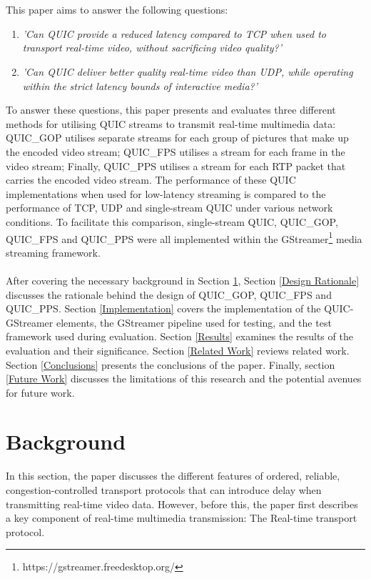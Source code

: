 \documentclass{mpaper}
\begin{document}
\\\\
This paper aims to answer the following questions: 
\begin{enumerate}
\item \textit{'Can QUIC provide a reduced latency compared to TCP when used to transport real-time video, without sacrificing video quality?'}
\item \textit{'Can QUIC deliver better quality real-time video than UDP, while operating within the strict latency bounds of interactive media?'}
\end{enumerate}


\noindent To answer these questions, this paper presents and evaluates three different methods for utilising QUIC streams to transmit real-time multimedia data: QUIC\_GOP utilises separate streams for each group of pictures that make up the encoded video stream; QUIC\_FPS utilises a stream for each frame in the video stream; Finally, QUIC\_PPS utilises a stream for each RTP packet that carries the encoded video stream. The performance of these QUIC implementations when used for low-latency streaming is compared to the performance of TCP, UDP and single-stream QUIC under various network conditions. To facilitate this comparison, single-stream QUIC, QUIC\_GOP, QUIC\_FPS and QUIC\_PPS were all implemented within the GStreamer\footnote{https://gstreamer.freedesktop.org/} media streaming framework.
\\\\
After covering the necessary background in Section \ref{Backgorund}, Section \ref{Design Rationale} discusses the rationale behind the design of \newline QUIC\_GOP, QUIC\_FPS and QUIC\_PPS. Section \ref{Implementation} covers the implementation of the QUIC-GStreamer elements, the GStreamer pipeline used for testing, and the test framework used during evaluation. Section \ref{Results} examines the results of the evaluation and their significance. Section \ref{Related Work} reviews related work. Section \ref{Conclusions} presents the conclusions of the paper. Finally, section \ref{Future Work} discusses the limitations of this research and the potential avenues for future work.


\section{Background} \label{Backgorund}

\noindent In this section, the paper discusses the different features of ordered, reliable, congestion-controlled transport protocols that can introduce delay when transmitting real-time video data. However, before this, the paper first describes a key component of real-time multimedia transmission: The Real-time transport protocol.
\end{document}
